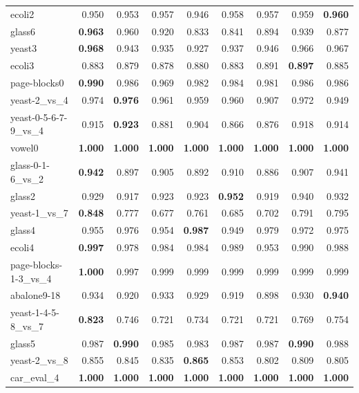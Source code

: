 \begin{table}[!htbp]
{\begin{tabular}{lrrrrrrrr}
 	ecoli2 & 0.950 & 0.953 & 0.957 & 0.946 & 0.958 & 0.957 & 0.959 & \textbf{0.960} \\
 	glass6 & \textbf{0.963} & 0.960 & 0.920 & 0.833 & 0.841 & 0.894 & 0.939 & 0.877 \\
 	yeast3 & \textbf{0.968} & 0.943 & 0.935 & 0.927 & 0.937 & 0.946 & 0.966 & 0.967 \\
 	ecoli3 & 0.883 & 0.879 & 0.878 & 0.880 & 0.883 & 0.891 & \textbf{0.897} & 0.885 \\
 	page-blocks0 & \textbf{0.990} & 0.986 & 0.969 & 0.982 & 0.984 & 0.981 & 0.986 & 0.986 \\
 	yeast-2\_vs\_4 & 0.974 & \textbf{0.976} & 0.961 & 0.959 & 0.960 & 0.907 & 0.972 & 0.949 \\
 	yeast-0-5-6-7-9\_vs\_4 & 0.915 & \textbf{0.923} & 0.881 & 0.904 & 0.866 & 0.876 & 0.918 & 0.914 \\
 	vowel0 & \textbf{1.000} & \textbf{1.000} & \textbf{1.000} & \textbf{1.000} & \textbf{1.000} & \textbf{1.000} & \textbf{1.000} & \textbf{1.000} \\
 	glass-0-1-6\_vs\_2 & \textbf{0.942} & 0.897 & 0.905 & 0.892 & 0.910 & 0.886 & 0.907 & 0.941 \\
 	glass2 & 0.929 & 0.917 & 0.923 & 0.923 & \textbf{0.952} & 0.919 & 0.940 & 0.932 \\
 	yeast-1\_vs\_7 & \textbf{0.848} & 0.777 & 0.677 & 0.761 & 0.685 & 0.702 & 0.791 & 0.795 \\
 	glass4 & 0.955 & 0.976 & 0.954 & \textbf{0.987} & 0.949 & 0.979 & 0.972 & 0.975 \\
 	ecoli4 & \textbf{0.997} & 0.978 & 0.984 & 0.984 & 0.989 & 0.953 & 0.990 & 0.988 \\
 	page-blocks-1-3\_vs\_4 & \textbf{1.000} & 0.997 & 0.999 & 0.999 & 0.999 & 0.999 & 0.999 & 0.999 \\
 	abalone9-18 & 0.934 & 0.920 & 0.933 & 0.929 & 0.919 & 0.898 & 0.930 & \textbf{0.940} \\
 	yeast-1-4-5-8\_vs\_7 & \textbf{0.823} & 0.746 & 0.721 & 0.734 & 0.721 & 0.721 & 0.769 & 0.754 \\
 	glass5 & 0.987 & \textbf{0.990} & 0.985 & 0.983 & 0.987 & 0.987 & \textbf{0.990} & 0.988 \\
 	yeast-2\_vs\_8 & 0.855 & 0.845 & 0.835 & \textbf{0.865} & 0.853 & 0.802 & 0.809 & 0.805 \\
 	car\_eval\_4 & \textbf{1.000} & \textbf{1.000} & \textbf{1.000} & \textbf{1.000} & \textbf{1.000} & \textbf{1.000} & \textbf{1.000} & \textbf{1.000} \\

\end{tabular}}
\end{table}
